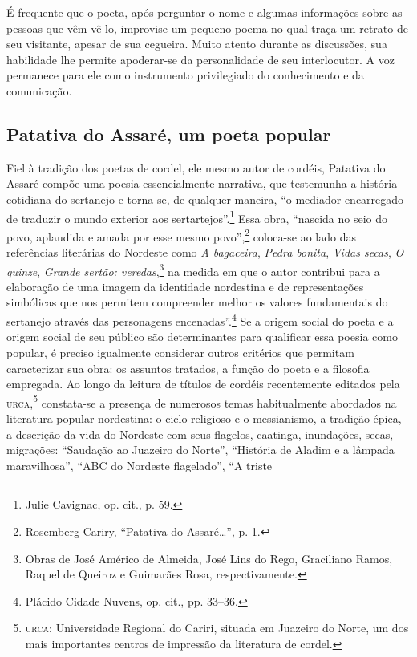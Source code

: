 \noindent É frequente que o poeta, após perguntar o nome e algumas
informações sobre as pessoas que vêm vê-lo, improvise um pequeno poema no qual
traça um retrato de seu visitante, apesar de sua cegueira. Muito atento durante
as discussões, sua habilidade lhe permite apoderar-se da personalidade de seu
interlocutor. A voz permanece para ele como instrumento privilegiado do
conhecimento e da comunicação.

\subsection{Patativa do Assaré, um poeta popular}

Fiel à tradição dos poetas de cordel, ele mesmo autor de cordéis, Patativa do
Assaré compõe uma poesia essencialmente narrativa, que testemunha a história
cotidiana do sertanejo e torna-se, de qualquer maneira, “o mediador encarregado
de traduzir o mundo exterior aos sertartejos”.\footnote{ Julie Cavignac, op.
cit., p. 59.} Essa obra, “nascida no seio do povo, aplaudida e amada por esse
mesmo povo”,\footnote{ Rosemberg Cariry, “Patativa do Assaré\ldots{}”, p. 1.}
coloca-se ao lado das referências literárias do Nordeste como \textit{A bagaceira}, \textit{Pedra
bonita}, \textit{Vidas secas}, \textit{O quinze}, \textit{Grande
sertão: veredas},\footnote{ Obras de José Américo de
Almeida, José Lins do Rego, Graciliano Ramos, Raquel de Queiroz e Guimarães
Rosa, respectivamente.} na medida em que o autor contribui para a elaboração de uma imagem da
identidade nordestina e de representações simbólicas que nos permitem
compreender melhor os valores fundamentais do sertanejo através das personagens
encenadas”.\footnote{ Plácido Cidade Nuvens, op. cit., pp. 33--36.} Se a
origem social do poeta e a origem social de seu público são determinantes para
qualificar essa poesia como popular, é preciso igualmente considerar outros
critérios que permitam caracterizar sua obra: os assuntos tratados, a função do
poeta e a filosofia empregada. Ao longo da leitura de títulos de cordéis
recentemente editados pela \textsc{urca},\footnote{ \textsc{urca}: Universidade Regional do Cariri,
situada em Juazeiro do Norte, um dos mais importantes centros de impressão da
literatura de cordel.} constata-se a presença de numerosos temas habitualmente
abordados na literatura popular nordestina: o ciclo religioso e o messianismo, a
tradição épica, a descrição da vida do Nordeste com seus flagelos, caatinga,
inundações, secas, migrações: “Saudação ao Juazeiro do Norte”, “História de
Aladim e a lâmpada maravilhosa”, “ABC do Nordeste flagelado”, “A triste

